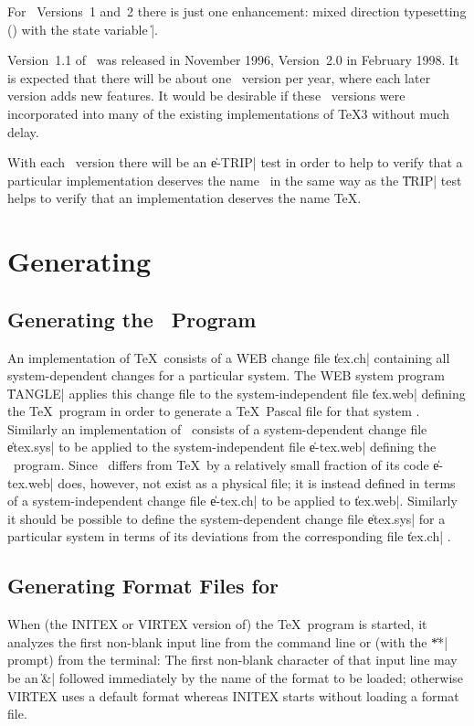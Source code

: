 \documentclass{article}
\begin{document}
For \eTeX\ Versions~1 and~2 there is just one enhancement:  mixed
direction typesetting (\TeXXeT) with the state variable \|\TeXXeTstate|.

Version~1.1 of \eTeX\ was released in November 1996, Version~2.0 in
February 1998.
It is expected that there will be about one \eTeX\ version per year,
where each later version adds new features.  It would be desirable if
these \eTeX\ versions were incorporated into many of the existing
implementations of \TeX3 without much delay.

With each \eTeX\ version there will be an \|e-TRIP| test \cite{etripman}
in order to help to verify that a particular implementation deserves the
name \eTeX\ in the same way as the \|TRIP| test \cite{tripman} helps to
verify that an implementation deserves the name \TeX.

\section{Generating \eTeX}

\subsection{Generating the \eTeX\ Program}

An implementation of \TeX\ consists of a WEB change file \|tex.ch|
containing all system-dependent changes for a particular system.  The
WEB system program \|TANGLE| applies this change file to the
system-independent file \|tex.web| defining the \TeX\ program in order to
generate a \TeX\ Pascal file for that system \cite{webman}.  Similarly
an implementation of \eTeX\ consists of a system-dependent change file
\|etex.sys| to be applied to the system-independent file \|e-tex.web|
defining the \eTeX\ program.  Since \eTeX\ differs from \TeX\ by a
relatively small fraction of its code \|e-tex.web| does, however, not
exist as a physical file; it is instead defined in terms of a
system-independent change file \|e-tex.ch| to be applied to \|tex.web|.
Similarly it should be possible to define the system-dependent change
file \|etex.sys| for a particular system in terms of its deviations
from the corresponding file \|tex.ch| \cite{etexgen}.

\subsection{Generating Format Files for \eTeX}

When (the INITEX or VIRTEX version of) the \TeX\ program is started, it
analyzes the first non-blank input line from the command line or (with
the \|**| prompt) from the terminal:  The first non-blank character of
that input line may be an \|&| followed immediately by the name of the
format to
be loaded; otherwise VIRTEX uses a default format whereas INITEX starts
without loading a format file.
\end{document}

